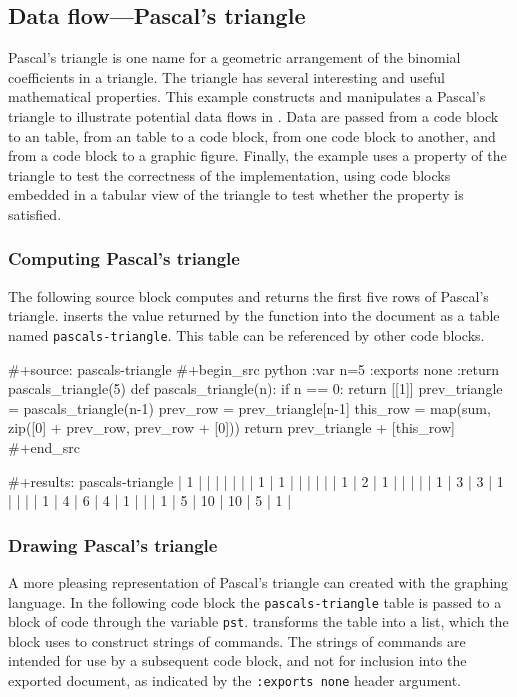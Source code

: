\documentclass[article,shortnames]{jss}
\begin{document}
\subsection{Data flow---Pascal's triangle}
\label{sec-4-1}
\label{pascals-triangle}


Pascal's triangle is one name for a geometric arrangement of the
binomial coefficients in a triangle.  The triangle has several
interesting and useful mathematical properties.  This example
constructs and manipulates a Pascal's triangle to illustrate potential
data flows in .  Data are passed from a code block to an
 table, from an  table to a code block, from one code
block to another, and from a code block to a graphic figure.  Finally,
the example uses a property of the triangle to test the correctness of
the implementation, using  code blocks embedded in a tabular
view of the triangle to test whether the property is satisfied.
\subsubsection{Computing Pascal's triangle}
\label{sec-4-1-1}

The following  source block computes and returns the first
five rows of Pascal's triangle.   inserts the value returned
by the  function into the  document as a table named
\texttt{pascals-triangle}.  This table can be referenced by other code
blocks.

\begin{Code}
#+source: pascals-triangle
#+begin_src python :var n=5 :exports none :return pascals_triangle(5)
  def pascals_triangle(n):
      if n == 0:
          return [[1]]
      prev_triangle = pascals_triangle(n-1)
      prev_row = prev_triangle[n-1]
      this_row = map(sum, zip([0] + prev_row, prev_row + [0]))
      return prev_triangle + [this_row]
#+end_src

#+results: pascals-triangle
| 1 |   |    |    |   |   |
| 1 | 1 |    |    |   |   |
| 1 | 2 |  1 |    |   |   |
| 1 | 3 |  3 |  1 |   |   |
| 1 | 4 |  6 |  4 | 1 |   |
| 1 | 5 | 10 | 10 | 5 | 1 |
\end{Code}
\subsubsection{Drawing Pascal's triangle}
\label{sec-4-1-2}

A more pleasing representation of Pascal's triangle can created with the 
graphing language.  In the following code block the \texttt{pascals-triangle}
table is passed to a block of  code through the
variable \texttt{pst}.   transforms the table into a  list,
which the  block uses to construct strings of  commands.  The
strings of  commands are intended for use by a subsequent code
block, and not for inclusion into the exported document, as indicated
by the \texttt{:exports none} header argument.
\end{document}

